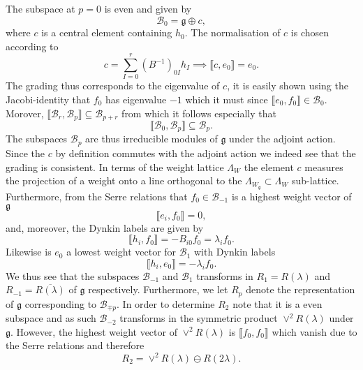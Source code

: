 The subspace at $p=0$ is even and given by 
\begin{equation}
    \mathscr{B}_0 = \mathfrak{g}\oplus c,
\end{equation}
where $c$ is a central element containing $h_0$. The normalisation of $c$ is chosen according to 
\begin{equation}
     c = \sum_{I=0}^r(B^{-1})_{0I}h_I \implies \llbracket c,e_0 \rrbracket = e_0.
\end{equation}
The grading thus corresponds to the eigenvalue of $c$, it is easily shown using the Jacobi-identity that $f_0$ has eigenvalue $-1$ which it must since $\llbracket e_0,f_0\rrbracket\in \mathscr{B}_0$. Morover, $\llbracket\mathscr{B}_r,\mathscr{B}_p\rrbracket \subseteq \mathscr{B}_{p+r}$ from which it follows especially that 
\begin{equation}
    \llbracket\mathscr{B}_0,\mathscr{B}_p\rrbracket \subseteq \mathscr{B}_p.
\end{equation}
The subspaces $\mathscr{B}_p$ are thus irreducible modules of $\mathfrak{g}$ under the adjoint action. Since the $c$ by definition commutes with the adjoint action we indeed see that the grading is consistent. In terms of the weight lattice $\Lambda_W$ the element $c$ measures the projection of a weight onto a line orthogonal to the $\Lambda_{W_\mathfrak{g}}\subset \Lambda_W$ sub-lattice. Furthermore, from the Serre relations that $f_0\in\mathscr{B}_{-1}$ is a highest weight vector of $\mathfrak{g}$ 
\begin{equation}
    \llbracket e_i, f_0\rrbracket = 0,
\end{equation}
and, moreover, the Dynkin labels are given by 
\begin{equation}
    \llbracket h_i,f_0\rrbracket = -B_{i0}f_0 = \lambda_if_0.
\end{equation}
Likewise is $e_0$ a lowest weight vector for $\mathscr{B}_1$ with Dynkin labels
\begin{equation}
    \llbracket h_i,e_0\rrbracket = -\lambda_if_0.
\end{equation}
We thus see that the subspaces $\mathscr{B}_{-1}$ and $\mathscr{B}_1$ transforms in $R_1=R(\lambda)$ and $R_{-1}=\overbar{R(\lambda)}$ of $\mathfrak{g}$ respectively. Furthermore, we let $R_{p}$ denote the representation of $\mathfrak{g}$ corresponding to $\mathscr{B}_{\mp p}$. In order to determine $R_2$ note that it is a even subspace and as such $\mathscr{B}_{-2}$ transforms in the symmetric product $\vee^2R(\lambda)$ under $\mathfrak{g}$. However, the highest weight vector of $\vee^2R(\lambda)$ is $\llbracket f_0,f_0\rrbracket$ which vanish due to the Serre relations and therefore 
\begin{equation}
    R_2 = \vee^2R(\lambda)\ominus R(2\lambda).
\end{equation}

